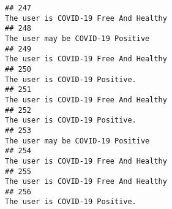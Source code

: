 \documentclass[
]{article}
\begin{document}
\begin{verbatim}
## 247                                                                                                                                                                                                                              The user is COVID-19 Free And Healthy
## 248                                                                                                                                                                                                                                  The user may be COVID-19 Positive
## 249                                                                                                                                                                                                                              The user is COVID-19 Free And Healthy
## 250                                                                                                                                                                                                                                     The user is COVID-19 Positive.
## 251                                                                                                                                                                                                                              The user is COVID-19 Free And Healthy
## 252                                                                                                                                                                                                                                     The user is COVID-19 Positive.
## 253                                                                                                                                                                                                                                  The user may be COVID-19 Positive
## 254                                                                                                                                                                                                                              The user is COVID-19 Free And Healthy
## 255                                                                                                                                                                                                                              The user is COVID-19 Free And Healthy
## 256                                                                                                                                                                                                                                     The user is COVID-19 Positive.

\end{verbatim}
\end{document}
